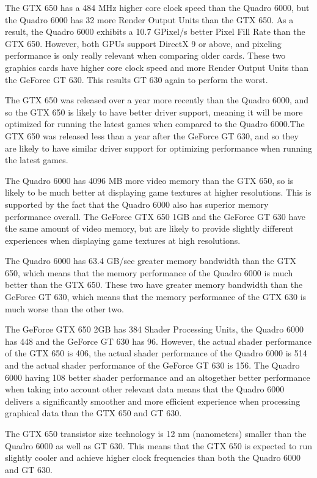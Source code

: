 \documentclass[paper=a4, fontsize=11pt]{scrartcl}
\numberwithin{equation}{section}		%
\numberwithin{figure}{section}			%
\numberwithin{table}{section}				%
\begin{document}
The GTX 650 has a 484 MHz higher core clock speed than the Quadro 6000, but the Quadro 6000 has 32 more Render Output Units than the GTX 650. As a result, the Quadro 6000 exhibits a 10.7 GPixel/s better Pixel Fill Rate than the GTX 650. However, both GPUs support DirectX 9 or above, and pixeling performance is only really relevant when comparing older cards. These two graphics cards have higher core clock speed and more Render Output Units than the GeForce GT 630. This results GT 630 again to perform the worst.

The GTX 650 was released over a year more recently than the Quadro 6000, and so the GTX 650 is likely to have better driver support, meaning it will be more optimized for running the latest games when compared to the Quadro 6000.The GTX 650 was released less than a year after the GeForce GT 630, and so they are likely to have similar driver support for optimizing performance when running the latest games. 

The Quadro 6000 has 4096 MB more video memory than the GTX 650, so is likely to be much better at displaying game textures at higher resolutions. This is supported by the fact that the Quadro 6000 also has superior memory performance overall. The GeForce GTX 650 1GB and the GeForce GT 630 have the same amount of video memory, but are likely to provide slightly different experiences when displaying game textures at high resolutions.

The Quadro 6000 has 63.4 GB/sec greater memory bandwidth than the GTX 650, which means that the memory performance of the Quadro 6000 is much better than the GTX 650. These two have greater memory bandwidth than the GeForce GT 630, which means that the memory performance of the GTX 630 is much worse than the other two. 

The GeForce GTX 650 2GB has 384 Shader Processing Units, the Quadro 6000 has 448 and the GeForce GT 630 has 96. However, the actual shader performance of the GTX 650 is 406, the actual shader performance of the Quadro 6000 is 514 and the actual shader performance of the GeForce GT 630 is 156. The Quadro 6000 having 108 better shader performance and an altogether better performance when taking into account other relevant data means that the Quadro 6000 delivers a significantly smoother and more efficient experience when processing graphical data than the GTX 650 and GT 630. 

The GTX 650 transistor size technology is 12 nm (nanometers) smaller than the Quadro 6000 as well as GT 630. This means that the GTX 650 is expected to run slightly cooler and achieve higher clock frequencies than both the Quadro 6000 and GT 630.
\end{document}
